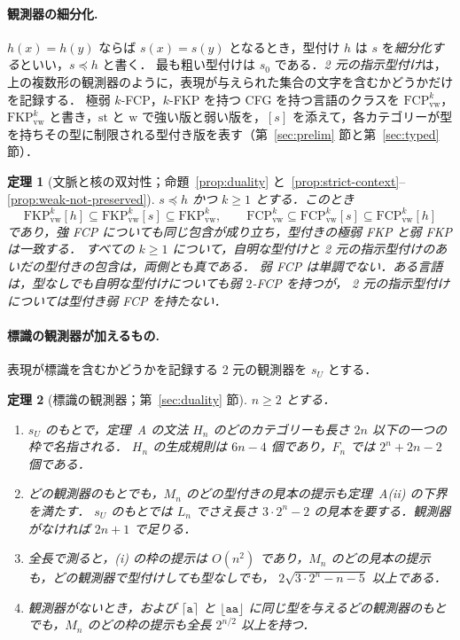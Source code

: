 \documentclass[11pt,a4paper]{ltjsarticle}
\numberwithin{equation}{section}
\theoremstyle{plain}
\theoremstyle{definition}
\theoremstyle{remark}
\theoremstyle{plain}
\newtheorem{mainthm}{定理}
\newcommand{\FCP}[2]{\mathrm{FCP}^{#1}_{\mathrm{#2}}}
\newcommand{\FKP}[2]{\mathrm{FKP}^{#1}_{\mathrm{#2}}}
\newcommand{\tFCP}[3]{\mathrm{FCP}^{#1}_{\mathrm{#2}}[#3]}
\newcommand{\tFKP}[3]{\mathrm{FKP}^{#1}_{\mathrm{#2}}[#3]}
\newcommand{\Lfl}{\lfloor}
\newcommand{\Rfl}{\rfloor}
\newcommand{\Lce}{\lceil}
\newcommand{\Rce}{\rceil}
\newcommand{\ta}{\mathtt a}
\begin{document}
\paragraph{観測器の細分化.}
$h(x)=h(y)$ ならば $s(x)=s(y)$ となるとき，型付け $h$ は $s$ を\emph{細分化する}といい，$s\preceq h$ と書く．
最も粗い型付けは $s_0$ である．\emph{2 元の指示型付け}は，上の複数形の観測器のように，表現が与えられた集合の文字を含むかどうかだけを記録する．
極弱 $k$-FCP，$k$-FKP を持つ CFG を持つ言語のクラスを $\FCP{k}{vw}$，$\FKP{k}{vw}$ と書き，$\mathrm{st}$ と $\mathrm{w}$ で強い版と弱い版を，$[s]$ を添えて，各カテゴリーが型を持ちその型に制限される型付き版を表す（第~\ref{sec:prelim} 節と第~\ref{sec:typed} 節）．

\begin{mainthm}[文脈と核の双対性；命題~\ref{prop:duality}
と~\ref{prop:strict-context}--\ref{prop:weak-not-preserved}]
$s\preceq h$ かつ $k\ge1$ とする．このとき
\[
\tFKP{k}{vw}{h}\subseteq\tFKP{k}{vw}{s}\subseteq\FKP{k}{vw},\qquad
\FCP{k}{vw}\subseteq\tFCP{k}{vw}{s}\subseteq\tFCP{k}{vw}{h}
\]
であり，強 FCP についても同じ包含が成り立ち，型付きの極弱 FKP と弱 FKP は一致する．
すべての $k\ge1$ について，自明な型付けと 2 元の指示型付けのあいだの型付きの包含は，両側とも真である．
弱 FCP は単調でない．ある言語は，型なしでも自明な型付けについても弱 $2$-FCP を持つが，
2 元の指示型付けについては型付き弱 FCP を持たない．
\end{mainthm}

\paragraph{標識の観測器が加えるもの.}
表現が標識を含むかどうかを記録する 2 元の観測器を $s_U$ とする．

\begin{mainthm}[標識の観測器；第~\ref{sec:duality} 節]
$n\ge2$ とする．
\begin{enumerate}[label=\textup{(\roman*)},nosep]
\item $s_U$ のもとで，定理~A の文法 $H_n$ のどのカテゴリーも長さ $2n$ 以下の一つの枠で名指される．
$H_n$ の生成規則は $6n-4$ 個であり，$F_n$ では $2^n+2n-2$ 個である．
\item どの観測器のもとでも，$M_n$ のどの型付きの見本の提示も定理~A(ii) の下界を満たす．
$s_U$ のもとでは $L_n$ でさえ長さ $3\cdot2^n-2$ の見本を要する．観測器がなければ $2n+1$ で足りる．
\item 全長で測ると，(i) の枠の提示は $O(n^2)$ であり，$M_n$ のどの見本の提示も，どの観測器で型付けしても型なしでも，
$2\sqrt{3\cdot2^n-n-5}$ 以上である．
\item 観測器がないとき，および $\Lce\ta\Rce$ と $\Lfl\ta\ta\Rfl$ に同じ型を与えるどの観測器のもとでも，$M_n$ のどの枠の提示も全長 $2^{n/2}$ 以上を持つ．
\end{enumerate}
\end{mainthm}
\end{document}
